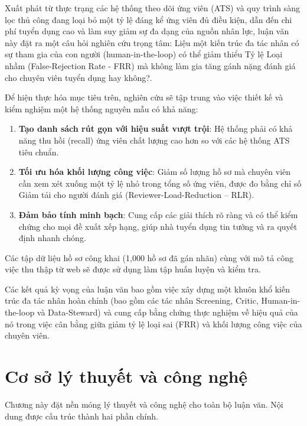 \documentclass{article}
\newcommand{\nocontentsline}[3]{}
\newcommand{\tocless}[2]{\bgroup\let\addcontentsline=\nocontentsline#1{#2}\egroup}
\begin{document}
Xuất phát từ thực trạng các hệ thống theo dõi ứng viên (ATS) và quy trình sàng lọc thủ công đang loại bỏ một tỷ lệ đáng kể ứng viên đủ điều kiện, dẫn đến chi phí tuyển dụng cao và làm suy giảm sự đa dạng của nguồn nhân lực, luận văn này đặt ra một câu hỏi nghiên cứu trọng tâm: Liệu một kiến trúc đa tác nhân có sự tham gia của con người (human-in-the-loop) có thể giảm thiểu Tỷ lệ Loại nhầm (False-Rejection Rate - FRR) mà không làm gia tăng gánh nặng đánh giá cho chuyên viên tuyển dụng hay không?.

Để hiện thực hóa mục tiêu trên, nghiên cứu sẽ tập trung vào việc thiết kế và kiểm nghiệm một hệ thống nguyên mẫu có khả năng:

\begin{enumerate}[topsep=0pt, itemsep=0pt, leftmargin=40pt, label=\arabic*.]
    \item \textbf{Tạo danh sách rút gọn với hiệu suất vượt trội}: Hệ thống phải có khả năng thu hồi (recall) ứng viên chất lượng cao hơn so với các hệ thống ATS tiêu chuẩn.
    \item \textbf{Tối ưu hóa khối lượng công việc}: Giảm số lượng hồ sơ mà chuyên viên cần xem xét xuống một tỷ lệ nhỏ trong tổng số ứng viên, được đo bằng chỉ số Giảm tải cho người đánh giá (Reviewer-Load-Reduction – RLR).
    \item \textbf{Đảm bảo tính minh bạch}: Cung cấp các giải thích rõ ràng và có thể kiểm chứng cho mọi đề xuất xếp hạng, giúp nhà tuyển dụng tin tưởng và ra quyết định nhanh chóng.
\end{enumerate}

Các tập dữ liệu hồ sơ công khai (1,000 hồ sơ đã gán nhãn) cùng với mô tả công việc thu thập từ web sẽ được sử dụng làm tập huấn luyện và kiểm tra.

Các kết quả kỳ vọng của luận văn bao gồm việc xây dựng một khuôn khổ kiến trúc đa tác nhân hoàn chỉnh (bao gồm các tác nhân Screening, Critic, Human-in-the-loop và Data-Steward) và cung cấp bằng chứng thực nghiệm về hiệu quả của nó trong việc cân bằng giữa giảm tỷ lệ loại sai (FRR) và khối lượng công việc của chuyên viên.

\newpage
\tocless\section{Cơ sở lý thuyết và công nghệ}
\setcounter{section}{2}
\addcontentsline{toc}{section}{\numberline{}CHƯƠNG 2: CƠ SỞ LÝ THUYẾT VÀ CÔNG NGHỆ}
\label{sec:chapter-2}

Chương này đặt nền móng lý thuyết và công nghệ cho toàn bộ luận văn. Nội dung được cấu trúc thành hai phần chính. 
\end{document}
